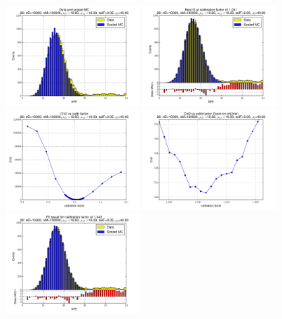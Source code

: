 
 \begin{figure}[htbp] \begin{center} 
\includegraphics[width=0.45\textwidth]{../FIGURES/28/FIG_Data_and_scaled_MC.pdf} 
\includegraphics[width=0.45\textwidth]{../FIGURES/28/FIG_Best_fit_at_calibration_factor_of_1_041.pdf} 
\includegraphics[width=0.45\textwidth]{../FIGURES/28/FIG_Chi2_vs_calib_factor.pdf} 
\includegraphics[width=0.45\textwidth]{../FIGURES/28/FIG_Chi2_vs_calib_factor_Zoom_on_chi2min.pdf} 
\includegraphics[width=0.45\textwidth]{../FIGURES/28/FIG_Fit_result_for_calibration_factor_of_1_043.pdf} 

\end{center}
\end{figure}
